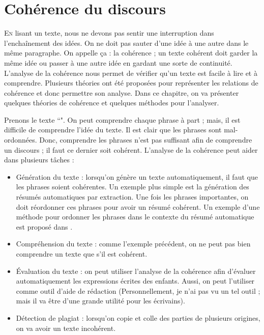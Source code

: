 \documentclass{KodeBook}
\begin{document}
		\mainmatter
	
\fi
\chapter{Cohérence du discours}

\begin{introduction}
	\lettrine{E}{n} lisant un texte, nous ne devons pas sentir une interruption dans l'enchaînement des idées.
	On ne doit pas sauter d'une idée à une autre dans le même paragraphe.
	On appelle ça : la cohérence ; un texte cohérent doit garder la même idée ou passer à une autre idée en gardant une sorte de continuité.
	L'analyse de la cohérence nous permet de vérifier qu'un texte est facile à lire et à comprendre. 
	Plusieurs théories ont été proposées pour représenter les relations de cohérence et donc permettre son analyse.
	Dans ce chapitre, on va présenter quelques théories de cohérence et quelques méthodes pour l'analyser.
\end{introduction} 

Prenons le texte ``".
On peut comprendre chaque phrase à part ; mais, il est difficile de comprendre l'idée du texte. 
Il est clair que les phrases sont mal-ordonnées. 
Donc, comprendre les phrases n'est pas suffisant afin de comprendre un discours ; il faut ce dernier soit cohérent.
L'analyse de la cohérence peut aider dans plusieurs tâches :
\begin{itemize}
	\item Génération du texte : lorsqu'on génère un texte automatiquement, il faut que les phrases soient cohérentes. 
	Un exemple plus simple est la génération des résumés automatiques par extraction. 
	Une fois les phrases importantes, on doit réordonner ces phrases pour avoir un résumé cohérent. 
	Un exemple d'une méthode pour ordonner les phrases dans le contexte du résumé automatique est proposé dans \cite{2019-oufaida-al}.
	\item Compréhension du texte : comme l'exemple précédent, on ne peut pas bien comprendre un texte que s'il est cohérent.
	\item Évaluation du texte : on peut utiliser l'analyse de la cohérence afin d'évaluer automatiquement les expressions écrites des enfants. 
	Aussi, on peut l'utiliser comme outil d'aide de rédaction (Personnellement, je n'ai pas vu un tel outil ; mais il va être d'une grande utilité pour les écrivains).
	\item Détection de plagiat : lorsqu'on copie et colle des parties de plusieurs origines, on va avoir un texte incohérent. 
\end{itemize}
\end{document}
